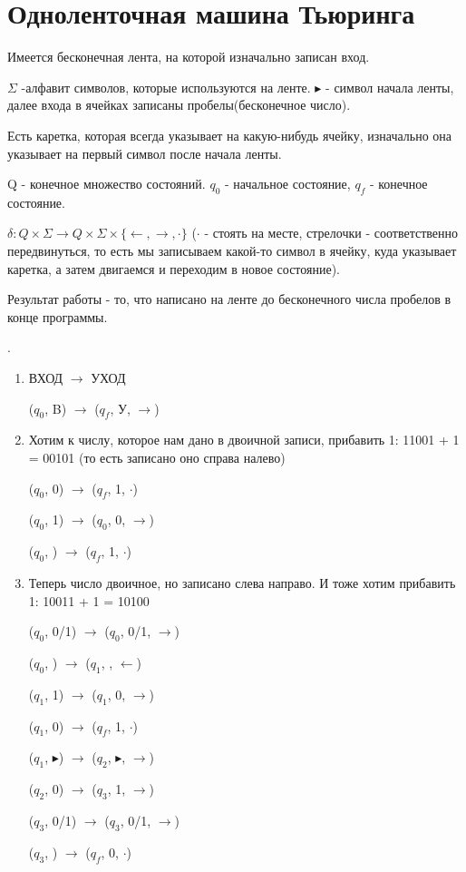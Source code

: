 \section{Одноленточная машина Тьюринга}
Имеется бесконечная лента, на которой изначально записан вход.


$\Sigma$ -алфавит символов, которые используются на ленте.
$\blacktriangleright$ - символ начала ленты, далее входа в ячейках записаны пробелы(бесконечное число).

Есть каретка, которая всегда указывает на какую-нибудь ячейку, изначально она указывает на первый символ после начала ленты.

Q - конечное множество состояний. $q_0$ - начальное состояние, $q_f$ - конечное состояние. 

$\delta: Q \times \Sigma \longrightarrow Q \times \Sigma \times \{\leftarrow, 
\rightarrow, \cdot\}$ ($\cdot$ - стоять на месте, стрелочки - соответственно передвинуться, то есть мы записываем какой-то символ в ячейку,
куда указывает каретка, а затем двигаемся и переходим в новое состояние).

Результат работы - то, что написано на ленте до бесконечного числа пробелов в конце программы.

\begin{exmp} .\\
	\begin{enumerate}
		\item ВХОД $\longrightarrow$ УХОД

		($q_0$, B) $\longrightarrow$ ($q_f$, У, $\rightarrow$)
		\item Хотим к числу, которое нам дано в двоичной записи, прибавить 1: 11001 + 1 = 00101 (то есть записано оно справа налево)

		($q_0$, 0) $\longrightarrow$ ($q_f$, 1, $\cdot$)

		($q_0$, 1) $\longrightarrow$ ($q_0$, 0, $\rightarrow$)

		($q_0$, \textvisiblespace) $\longrightarrow$ ($q_f$, 1, $\cdot$)
		\item Теперь число двоичное, но записано слева направо. И тоже хотим прибавить 1: 10011 + 1 = 10100

		($q_0$, 0/1) $\longrightarrow$ ($q_0$, 0/1, $\rightarrow$)

		($q_0$, \textvisiblespace) $\longrightarrow$ ($q_1$, \textvisiblespace, $\leftarrow$)

		($q_1$, 1) $\longrightarrow$ ($q_1$, 0, $\rightarrow$)

		($q_1$, 0) $\longrightarrow$ ($q_f$, 1, $\cdot$)

		($q_1$, $\blacktriangleright$) $\longrightarrow$ ($q_2$, $\blacktriangleright$, $\rightarrow$)

		($q_2$, 0) $\longrightarrow$ ($q_3$, 1, $\rightarrow$)

		($q_3$, 0/1) $\longrightarrow$ ($q_3$, 0/1, $\rightarrow$)

		($q_3$, \textvisiblespace) $\longrightarrow$ ($q_f$, 0, $\cdot$)
	\end{enumerate}	
\end{exmp}